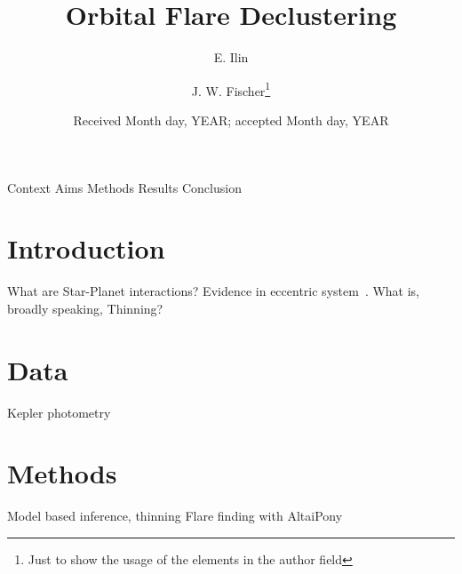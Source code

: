 \documentclass[referee]{aa} %
\begin{document}
 


   \title{Orbital Flare Declustering}


   \author{E. Ilin
          \and
          J. W. Fischer\fnmsep\thanks{Just to show the usage
          of the elements in the author field}
          }


   \date{Received Month day, YEAR; accepted Month day, YEAR}

 
  \abstract
   {Context}
   {Aims}
   {Methods}
   {Results}
   {Conclusion}

   \keywords{ --%
                 --}

   \maketitle
%

\section{Introduction}
What are Star-Planet interactions? Evidence in eccentric system~\citep{maggio2015}. 
What is, broadly speaking, Thinning?


\section{Data}
Kepler photometry

\section{Methods}
Model based inference, thinning
Flare finding with AltaiPony
\end{document}
